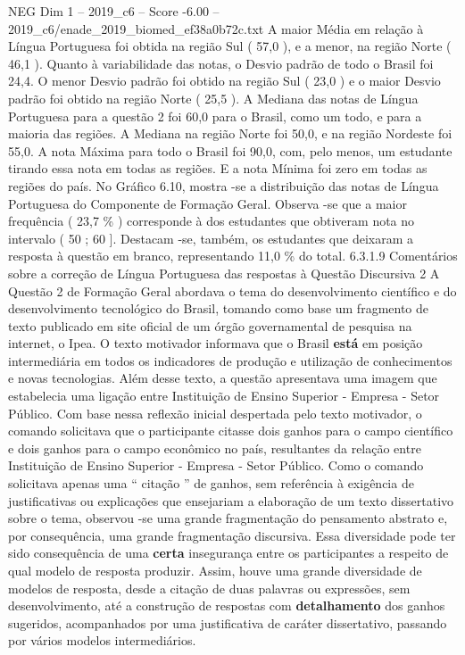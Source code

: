\begin{textsample}{NEG Dim 1 – 2019\_c6 – Score -6.00 – 2019\_c6/enade\_2019\_biomed\_ef38a0b72c.txt}
A maior Média em relação à Língua Portuguesa foi obtida na região Sul ( 57,0 ), e a menor, na região Norte ( 46,1 ).
Quanto à variabilidade das notas, o Desvio padrão de todo o Brasil foi 24,4.
O menor Desvio padrão foi obtido na região Sul ( 23,0 ) e o maior Desvio padrão foi obtido na região Norte ( 25,5 ).
A Mediana das notas de Língua Portuguesa para a questão 2 foi 60,0 para o Brasil, como um todo, e para a maioria das regiões.
A Mediana na região Norte foi 50,0, e na região Nordeste foi 55,0.
A nota Máxima para todo o Brasil foi 90,0, com, pelo menos, um estudante tirando essa nota em todas as regiões.
E a nota Mínima foi zero em todas as regiões do país.
No Gráfico 6.10, mostra -se a distribuição das notas de Língua Portuguesa do Componente de Formação Geral.
Observa -se que a maior frequência ( 23,7 \% ) corresponde à dos estudantes que obtiveram nota no intervalo ( 50 ; 60 ].
Destacam -se, também, os estudantes que deixaram a resposta à questão em branco, representando 11,0 \% do total. 6.3.1.9 Comentários sobre a correção de Língua Portuguesa das respostas à Questão Discursiva 2 A Questão 2 de Formação Geral abordava o tema do desenvolvimento científico e do desenvolvimento tecnológico do Brasil, tomando como base um fragmento de texto publicado em site oficial de um órgão governamental de pesquisa na internet, o Ipea.
O texto motivador informava que o Brasil \textbf{está} em posição intermediária em todos os indicadores de produção e utilização de conhecimentos e novas tecnologias.
Além desse texto, a questão apresentava uma imagem que estabelecia uma ligação entre Instituição de Ensino Superior - Empresa - Setor Público.
Com base nessa reflexão inicial despertada pelo texto motivador, o comando solicitava que o participante citasse dois ganhos para o campo científico e dois ganhos para o campo econômico no país, resultantes da relação entre Instituição de Ensino Superior - Empresa - Setor Público.
Como o comando solicitava apenas uma “ citação ” de ganhos, sem referência à exigência de justificativas ou explicações que ensejariam a elaboração de um texto dissertativo sobre o tema, observou -se uma grande fragmentação do pensamento abstrato e, por consequência, uma grande fragmentação discursiva.
Essa diversidade pode ter sido consequência de uma \textbf{certa} insegurança entre os participantes a respeito de qual modelo de resposta produzir.
Assim, houve uma grande diversidade de modelos de resposta, desde a citação de duas palavras ou expressões, sem desenvolvimento, até a construção de respostas com \textbf{detalhamento} dos ganhos sugeridos, acompanhados por uma justificativa de caráter dissertativo, passando por vários modelos intermediários.

\end{textsample}
